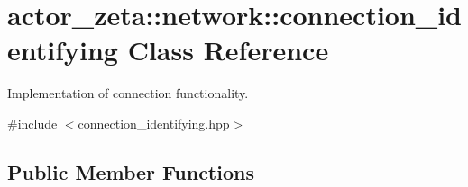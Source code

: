 \hypertarget{classactor__zeta_1_1network_1_1connection__identifying}{}\section{actor\+\_\+zeta\+:\+:network\+:\+:connection\+\_\+identifying Class Reference}
\label{classactor__zeta_1_1network_1_1connection__identifying}


Implementation of connection functionality.  




{\ttfamily \#include $<$connection\+\_\+identifying.\+hpp$>$}

\subsection*{Public Member Functions}

